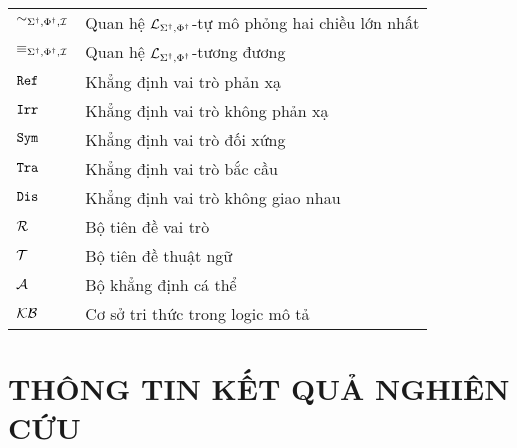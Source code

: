\begin{tabular}{| p{2.5cm} | p{10.0cm} |}
	$\sim_{\Sigma^\dag,\Phi^\dag,\mathcal{I}}$ & Quan hệ $\mathcal{L}_{\Sigma^\dag,\Phi^\dag}$-tự mô phỏng hai chiều lớn nhất\\
	$\equiv_{\Sigma^\dag,\Phi^\dag,\mathcal{I}}$ & Quan hệ $\mathcal{L}_{\Sigma^\dag,\Phi^\dag}$-tương đương\\
	$\mathtt{Ref}$ & Khẳng định vai trò phản xạ\\
	$\mathtt{Irr}$ & Khẳng định vai trò không phản xạ\\
	$\mathtt{Sym}$ & Khẳng định vai trò đối xứng \\
	$\mathtt{Tra}$ & Khẳng định vai trò bắc cầu \\
	$\mathtt{Dis}$ & Khẳng định vai trò không giao nhau\\
	$\mathcal{R}$ & Bộ tiên đề vai trò\\
	$\mathcal{T}$ & Bộ tiên đề thuật ngữ \\
	$\mathcal{A}$ & Bộ khẳng định cá thể\\
	$\mathcal{KB}$ & Cơ sở tri thức trong logic mô tả\\	
	\hline
\end{tabular}

\cleardoublepage
\newpage
\renewcommand\listfigurename{\!\!\!\!\!\!\!\!\!\chapterFont\hfill DANH MỤC HÌNH VẼ\hfill}
\listoffigures{\thispagestyle{fancy}}
\cleardoublepage

\newpage
\chapter*{THÔNG TIN KẾT QUẢ NGHIÊN CỨU}
\thispagestyle{fancy}

